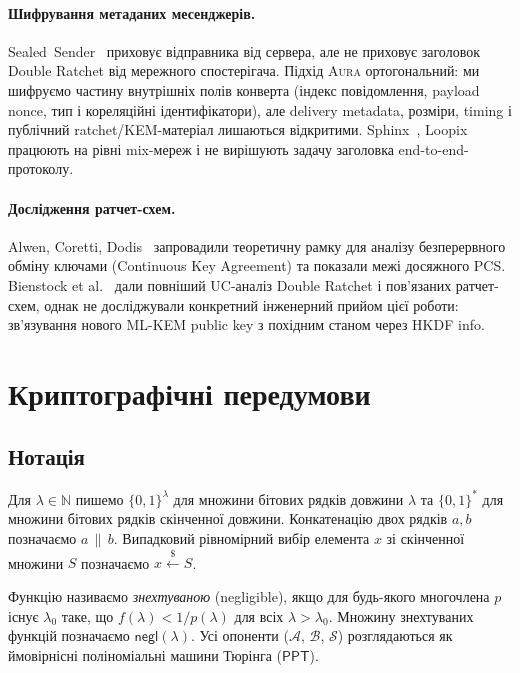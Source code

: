 \documentclass[11pt,a4paper]{article}
\theoremstyle{definition}
\newcommand{\secpar}{\ensuremath{\lambda}}
\newcommand{\negl}{\ensuremath{\mathsf{negl}}}
\newcommand{\ppt}{\ensuremath{\mathsf{PPT}}}
\newcommand{\advA}{\ensuremath{\mathcal{A}}}
\newcommand{\advB}{\ensuremath{\mathcal{B}}}
\newcommand{\advS}{\ensuremath{\mathcal{S}}}
\newcommand{\concat}{\ensuremath{\,\|\,}}
\newcommand{\getsr}{\ensuremath{\stackrel{\$}{\gets}}}
\newcommand{\Aura}{\mbox{\normalfont\scshape Aura}}
\begin{document}
\paragraph{Шифрування метаданих месенджерів.}
Sealed~Sender~\cite{sealed-sender} приховує відправника від сервера,
але не приховує заголовок Double Ratchet від мережного спостерігача.
Підхід \Aura{} ортогональний: ми шифруємо частину внутрішніх полів
конверта (індекс повідомлення, payload nonce, тип і кореляційні
ідентифікатори), але delivery metadata, розміри, timing і публічний
ratchet/KEM-матеріал лишаються відкритими. Sphinx~\cite{sphinx}, Loopix~\cite{loopix}
працюють на рівні mix-мереж і не вирішують задачу заголовка
end-to-end-протоколу.

\paragraph{Дослідження ратчет-схем.}
Alwen, Coretti, Dodis~\cite{acd2019} запровадили теоретичну рамку для
аналізу безперервного обміну ключами (Continuous Key Agreement) та
показали межі досяжного PCS. Bienstock et al.~\cite{bienstock2020}
дали повніший UC-аналіз Double Ratchet і пов'язаних ратчет-схем, однак
не досліджували конкретний інженерний прийом цієї роботи: зв'язування
нового ML-KEM public key з похідним станом через HKDF info.

\section{Криптографічні передумови}\label{sec:prelim}

\subsection{Нотація}\label{sec:notation}

Для $\secpar \in \mathbb{N}$ пишемо $\{0,1\}^{\secpar}$ для множини бітових
рядків довжини $\secpar$ та $\{0,1\}^{*}$ для множини бітових рядків
скінченної довжини. Конкатенацію двох рядків $a, b$ позначаємо
$a \concat b$. Випадковий рівномірний вибір елемента $x$ зі скінченної
множини $S$ позначаємо $x \getsr S$.

Функцію називаємо \emph{знехтуваною} (negligible), якщо для будь-якого
многочлена $p$ існує $\secpar_0$ таке, що $f(\secpar) < 1/p(\secpar)$ для
всіх $\secpar > \secpar_0$. Множину знехтуваних функцій позначаємо
$\negl(\secpar)$. Усі опоненти ($\advA$, $\advB$, $\advS$) розглядаються
як ймовірнісні поліноміальні машини Тюрінга (\ppt).
\end{document}
